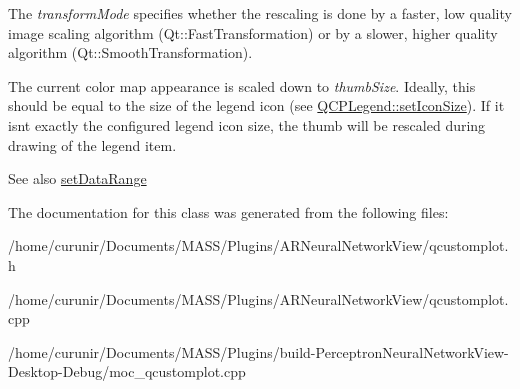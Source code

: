 The {\itshape transform\+Mode} specifies whether the rescaling is done by a faster, low quality image scaling algorithm (Qt\+::\+Fast\+Transformation) or by a slower, higher quality algorithm (Qt\+::\+Smooth\+Transformation).

The current color map appearance is scaled down to {\itshape thumb\+Size}. Ideally, this should be equal to the size of the legend icon (see \hyperlink{class_q_c_p_legend_a8b0740cce488bf7010da6beda6898984}{Q\+C\+P\+Legend\+::set\+Icon\+Size}). If it isn\textquotesingle{}t exactly the configured legend icon size, the thumb will be rescaled during drawing of the legend item.

\begin{DoxySeeAlso}{See also}
\hyperlink{class_q_c_p_color_map_a980b42837821159786a85b4b7dcb8774}{set\+Data\+Range} 
\end{DoxySeeAlso}


The documentation for this class was generated from the following files\+:\begin{DoxyCompactItemize}
\item 
/home/curunir/\+Documents/\+M\+A\+S\+S/\+Plugins/\+A\+R\+Neural\+Network\+View/qcustomplot.\+h\item 
/home/curunir/\+Documents/\+M\+A\+S\+S/\+Plugins/\+A\+R\+Neural\+Network\+View/qcustomplot.\+cpp\item 
/home/curunir/\+Documents/\+M\+A\+S\+S/\+Plugins/build-\/\+Perceptron\+Neural\+Network\+View-\/\+Desktop-\/\+Debug/moc\+\_\+qcustomplot.\+cpp\end{DoxyCompactItemize}
